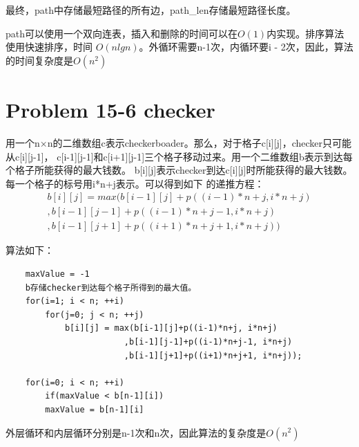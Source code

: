 \documentclass[a4paper, 11pt]{article}
\begin{document}
最终，path中存储最短路径的所有边，path\_len存储最短路径长度。

path可以使用一个双向连表，插入和删除的时间可以在$O(1)$内实现。排序算法使用快速排序，时间
$O(nlgn)$。外循环需要n-1次，内循环要i - 2次，因此，算法的时间复杂度是$O(n ^ 2)$

\section{Problem 15-6 checker}

用一个n×n的二维数组c表示checkerboader。那么，对于格子c[i][j]，checker只可能从c[i][j-1]，
c[i-1][j-1]和c[i+1][j-1]三个格子移动过来。用一个二维数组b表示到达每个格子所能获得的最大钱数。
b[i][j]表示checker到达c[i][j]时所能获得的最大钱数。每一个格子的标号用i*n+j表示。可以得到如下
的递推方程：
\begin{align*}
                     b[i][j]=max(b[i-1][j]+p((i-1)*n+j, i*n+j)\\
                     		,b[i-1][j-1]+p((i-1)*n+j-1, i*n+j)\\
                     		,b[i-1][j+1]+p((i+1)*n+j+1, i*n+j))
\end{align*}

算法如下：
\begin{verbatim}
    maxValue = -1
    b存储checker到达每个格子所得到的最大值。
    for(i=1; i < n; ++i)
        for(j=0; j < n; ++j)
            b[i][j] = max(b[i-1][j]+p((i-1)*n+j, i*n+j)
                        ,b[i-1][j-1]+p((i-1)*n+j-1, i*n+j)
                        ,b[i-1][j+1]+p((i+1)*n+j+1, i*n+j));

    for(i=0; i < n; ++i)
        if(maxValue < b[n-1][i])
        maxValue = b[n-1][i]
\end{verbatim}
	
外层循环和内层循环分别是n-1次和n次，因此算法的复杂度是$O(n^2)$
\end{document}
